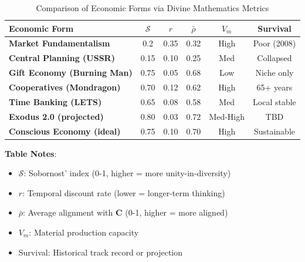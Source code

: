 \documentclass[11pt,a4paper]{article}
\theoremstyle{definition}
\theoremstyle{remark}
\begin{document}
\begin{enumerate}
\vspace{2em}

\begin{table}[H]
\centering
\caption{Comparison of Economic Forms via Divine Mathematics Metrics}
\label{tab:economic_forms_comparison}
\begin{tabular}{|l|c|c|c|c|c|}
\hline
\textbf{Economic Form} & \(\mathcal{S}\) & \(r\) & \(\bar{\rho}\) & \(V_m\) & \textbf{Survival} \\
\hline
\textbf{Market Fundamentalism} & 0.2 & 0.35 & 0.32 & High & Poor (2008) \\
\hline
\textbf{Central Planning (USSR)} & 0.15 & 0.10 & 0.25 & Med & Collapsed \\
\hline
\textbf{Gift Economy (Burning Man)} & 0.75 & 0.05 & 0.68 & Low & Niche only \\
\hline
\textbf{Cooperatives (Mondragon)} & 0.70 & 0.12 & 0.62 & High & 65+ years \\
\hline
\textbf{Time Banking (LETS)} & 0.65 & 0.08 & 0.58 & Med & Local stable \\
\hline
\textbf{Exodus 2.0 (projected)} & 0.80 & 0.03 & 0.72 & Med-High & TBD \\
\hline
\textbf{Conscious Economy (ideal)} & 0.75 & 0.10 & 0.70 & High & Sustainable \\
\hline
\end{tabular}
\end{table}

\vspace{1em}

\textbf{Table Notes}:
\begin{itemize}[nosep]
    \item \(\mathcal{S}\): Sobornost' index (0-1, higher = more unity-in-diversity)
    \item \(r\): Temporal discount rate (lower = longer-term thinking)
    \item \(\bar{\rho}\): Average alignment with \(\mathbf{C}\) (0-1, higher = more aligned)
    \item \(V_m\): Material production capacity
    \item Survival: Historical track record or projection
\end{itemize}


\end{enumerate}
\end{document}
